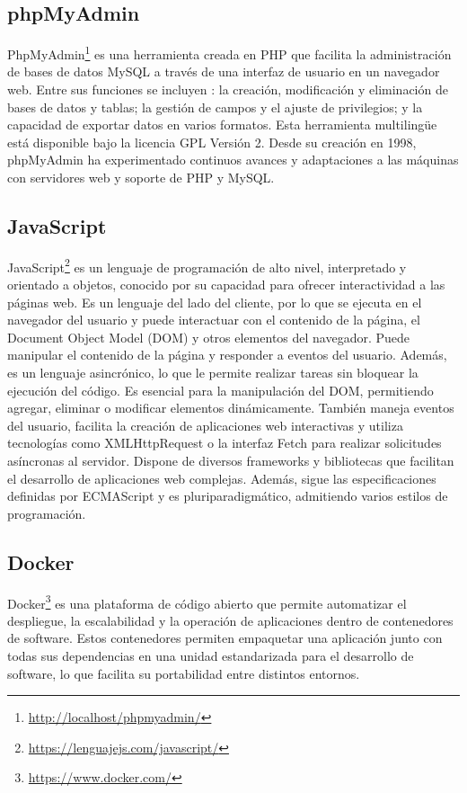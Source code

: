 \documentclass[a4paper, 12pt]{book}
\begin{document}
\subsection{phpMyAdmin}
\label{subsec:phpmyadmin} 
PhpMyAdmin\footnote{\url{http://localhost/phpmyadmin/}} es una herramienta creada en PHP que facilita la administración de bases de datos 
MySQL a través de una interfaz de usuario en un navegador web. 
Entre sus funciones se incluyen \cite{phpmyadmin}: la creación, modificación y eliminación de bases de datos y tablas; la gestión de campos y el ajuste de privilegios; y la 
capacidad de exportar datos en varios formatos. Esta herramienta multilingüe está disponible bajo la licencia GPL Versión 2. Desde su creación en 1998, 
phpMyAdmin ha experimentado continuos avances y adaptaciones a las máquinas con servidores web y soporte de PHP y MySQL.

\subsection{JavaScript}
\label{subsec:JavaScript} 
JavaScript\footnote{\url{https://lenguajejs.com/javascript/}} es un lenguaje de programación de alto nivel, interpretado y orientado a objetos, conocido por su capacidad para ofrecer 
interactividad a las páginas web. Es un lenguaje del lado del cliente, por lo que se ejecuta en el navegador del usuario y puede interactuar con el contenido 
de la página, el Document Object Model (DOM) y otros elementos del navegador. Puede manipular el contenido de la página y responder a eventos del usuario. 
Además, es un lenguaje asincrónico, lo que le permite realizar tareas sin bloquear la ejecución del código. Es esencial para la manipulación del DOM, permitiendo 
agregar, eliminar o modificar elementos dinámicamente. También maneja eventos del usuario, facilita la creación de aplicaciones web interactivas y utiliza 
tecnologías como XMLHttpRequest o la interfaz Fetch para realizar solicitudes asíncronas al servidor. Dispone de diversos frameworks y bibliotecas que facilitan 
el desarrollo de aplicaciones web complejas. Además, sigue las especificaciones definidas por ECMAScript y es pluriparadigmático, admitiendo varios estilos de 
programación.

\subsection{Docker}
\label{subsec:Docker}
Docker\footnote{\url{https://www.docker.com/}} es una plataforma de código abierto que permite automatizar el despliegue, la escalabilidad y la operación de 
aplicaciones dentro de contenedores de software. Estos contenedores permiten empaquetar una aplicación junto con todas sus dependencias en una unidad estandarizada 
para el desarrollo de software, lo que facilita su portabilidad entre distintos entornos.
\end{document}
